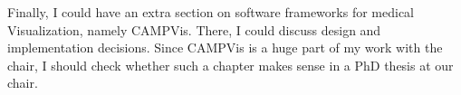 Finally, I could have an extra section on software frameworks for medical Visualization, namely CAMPVis. There, I could discuss design and implementation decisions. Since CAMPVis is a huge part of my work with the chair, I should check whether such a chapter makes sense in a PhD thesis at our chair.



